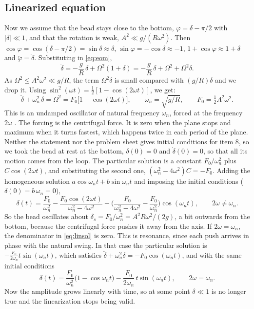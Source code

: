 \documentclass[11pt,a4paper]{article}
\newcommand{\dt}[1]{\dot{#1}}
\newcommand{\ddt}[1]{\ddot{#1}}
\begin{document}
\subsection{Linearized equation}\label{sec:lin}
Now we assume that the bead stays close to the bottom, $\varphi=\delta-\pi/2$ with $|\delta|\ll1$, and that the rotation is weak, $A^2\ll g/(R\omega^2)$. Then $\cos\varphi=\cos(\delta-\pi/2)=\sin\delta\approx\delta$, $\sin\varphi=-\cos\delta\approx-1$, $1+\cos\varphi\approx1+\delta$ and $\ddt\varphi=\ddt\delta$. Substituting in \cref{eq:eom},
\begin{equation}
\ddt\delta=-\frac gR\,\delta+\Omega^2(1+\delta)=-\frac gR\,\delta+\Omega^2+\Omega^2\delta .
\end{equation}
As $\Omega^2\le A^2\omega^2\ll g/R$, the term $\Omega^2\delta$ is small compared with $(g/R)\delta$ and we drop it. Using $\sin^2(\omega t)=\tfrac12[1-\cos(2\omega t)]$, we get:
\begin{equation}
\ddt\delta+\omega_n^2\,\delta=\Omega^2=F_0\big[1-\cos(2\omega t)\big],\qquad \omega_n=\sqrt{g/R},\qquad F_0=\tfrac12A^2\omega^2 .
\label{eq:lin}
\end{equation}
This is an undamped oscillator of natural frequency $\omega_n$, forced at the frequency $2\omega$ \cite{notes}. The forcing is the centrifugal force. It is zero when the plane stops and maximum when it turns fastest, which happens twice in each period of the plane. Neither the statement nor the problem sheet \cite{problems} gives initial conditions for item 8, so we took the bead at rest at the bottom, $\delta(0)=0$ and $\dt\delta(0)=0$, so that all its motion comes from the loop. The particular solution is a constant $F_0/\omega_n^2$ plus $C\cos(2\omega t)$, and substituting the second one, $(\omega_n^2-4\omega^2)C=-F_0$. Adding the homogeneous solution $a\cos\omega_nt+b\sin\omega_nt$ and imposing the initial conditions ($\dt\delta(0)=b\,\omega_n=0$),
\begin{equation}
\delta(t)=\frac{F_0}{\omega_n^2}-\frac{F_0\cos(2\omega t)}{\omega_n^2-4\omega^2}+\Big(\frac{F_0}{\omega_n^2-4\omega^2}-\frac{F_0}{\omega_n^2}\Big)\cos(\omega_nt),\qquad 2\omega\neq\omega_n .
\label{eq:linsol}
\end{equation}
So the bead oscillates about $\delta_s=F_0/\omega_n^2=A^2R\omega^2/(2g)$, a bit outwards from the bottom, because the centrifugal force pushes it away from the axis. If $2\omega=\omega_n$, the denominator in \cref{eq:linsol} is zero. This is resonance, since each push arrives in phase with the natural swing. In that case the particular solution is $-\frac{F_0}{2\omega_n}t\sin(\omega_nt)$, which satisfies $\ddt\delta+\omega_n^2\delta=-F_0\cos(\omega_nt)$, and with the same initial conditions
\begin{equation}
\delta(t)=\frac{F_0}{\omega_n^2}\big(1-\cos\omega_nt\big)-\frac{F_0}{2\omega_n}\,t\sin(\omega_nt),\qquad 2\omega=\omega_n .
\label{eq:res}
\end{equation}
Now the amplitude grows linearly with time, so at some point $\delta\ll1$ is no longer true and the linearization stops being valid.
\end{document}
